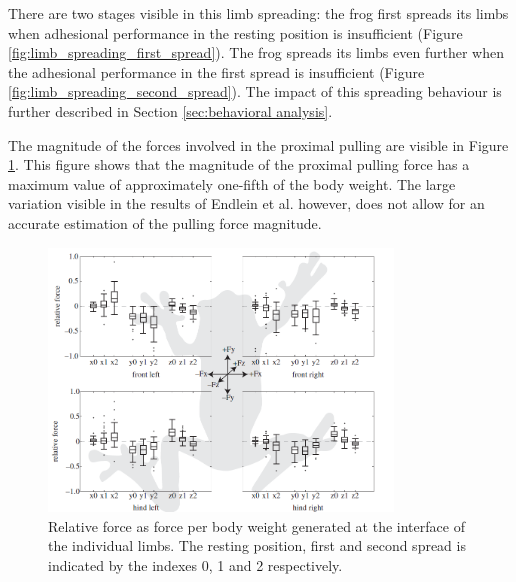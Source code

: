 \qquad There are two stages visible in this limb spreading: the frog first spreads its limbs when adhesional performance in the resting position is insufficient (Figure \ref{fig:limb_spreading_first_spread}). The frog spreads its limbs even further when the adhesional performance in the first spread is insufficient (Figure \ref{fig:limb_spreading_second_spread}). The impact of this spreading behaviour is further described in Section \ref{sec:behavioral analysis}. 

\qquad The magnitude of the forces involved in the proximal pulling are visible in Figure \ref{fig:mag_pulling}. This figure shows that the magnitude of the proximal pulling force has a maximum value of approximately one-fifth of the body weight. The large variation visible in the results of Endlein et al. however, does not allow for an accurate estimation of the pulling force magnitude. 

\begin{figure}
    \includegraphics[width=0.65\linewidth, height=7cm, angle=0]{images/limb spreading/work_endlein.PNG}
    \caption{Relative force as force per body weight generated at the interface of the individual limbs. The resting position, first and second spread is indicated by the indexes 0, 1 and 2 respectively.}
    \label{fig:mag_pulling}
\end{figure}







